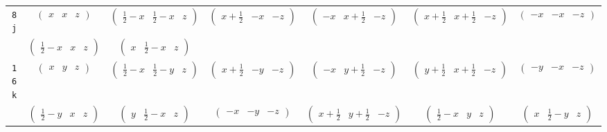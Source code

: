 \documentclass[fleqn,9pt,landscape]{jsarticle}
\begin{document}
\begin{center}
\begin{longtable}{ccccccc}
{\tt 8j} & $ \begin{pmatrix} x & x & z \end{pmatrix} $ & $ \begin{pmatrix} \frac{1}{2} - x & \frac{1}{2} - x & z \end{pmatrix} $ & $ \begin{pmatrix} x + \frac{1}{2} & - x & - z \end{pmatrix} $ & $ \begin{pmatrix} - x & x + \frac{1}{2} & - z \end{pmatrix} $ & $ \begin{pmatrix} x + \frac{1}{2} & x + \frac{1}{2} & - z \end{pmatrix} $ & $ \begin{pmatrix} - x & - x & - z \end{pmatrix} $ \\
& $ \begin{pmatrix} \frac{1}{2} - x & x & z \end{pmatrix} $ & $ \begin{pmatrix} x & \frac{1}{2} - x & z \end{pmatrix} $ & $  $ & $  $ & $  $ & $  $ \\ \hline
{\tt 16k} & $ \begin{pmatrix} x & y & z \end{pmatrix} $ & $ \begin{pmatrix} \frac{1}{2} - x & \frac{1}{2} - y & z \end{pmatrix} $ & $ \begin{pmatrix} x + \frac{1}{2} & - y & - z \end{pmatrix} $ & $ \begin{pmatrix} - x & y + \frac{1}{2} & - z \end{pmatrix} $ & $ \begin{pmatrix} y + \frac{1}{2} & x + \frac{1}{2} & - z \end{pmatrix} $ & $ \begin{pmatrix} - y & - x & - z \end{pmatrix} $ \\
& $ \begin{pmatrix} \frac{1}{2} - y & x & z \end{pmatrix} $ & $ \begin{pmatrix} y & \frac{1}{2} - x & z \end{pmatrix} $ & $ \begin{pmatrix} - x & - y & - z \end{pmatrix} $ & $ \begin{pmatrix} x + \frac{1}{2} & y + \frac{1}{2} & - z \end{pmatrix} $ & $ \begin{pmatrix} \frac{1}{2} - x & y & z \end{pmatrix} $ & $ \begin{pmatrix} x & \frac{1}{2} - y & z \end{pmatrix} $ \\

\end{longtable}
\end{center}
\end{document}
